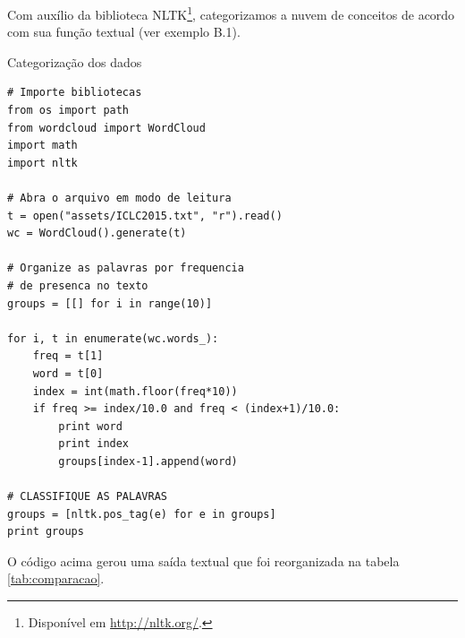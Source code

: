 Com auxílio da biblioteca NLTK\footnote{Disponível em \url{http://nltk.org/}.}, categorizamos a nuvem de conceitos de acordo com sua função textual (ver exemplo B.1). 

\begin{example}{Categorização dos dados}
\begin{verbatim}
# Importe bibliotecas
from os import path
from wordcloud import WordCloud
import math
import nltk

# Abra o arquivo em modo de leitura
t = open("assets/ICLC2015.txt", "r").read()
wc = WordCloud().generate(t)

# Organize as palavras por frequencia
# de presenca no texto
groups = [[] for i in range(10)]

for i, t in enumerate(wc.words_):
    freq = t[1]
    word = t[0]
    index = int(math.floor(freq*10))
    if freq >= index/10.0 and freq < (index+1)/10.0:
        print word
        print index
        groups[index-1].append(word)

# CLASSIFIQUE AS PALAVRAS
groups = [nltk.pos_tag(e) for e in groups]
print groups
\end{verbatim}
\label{cod:classes}
\end{example}

O código acima gerou uma saída textual que foi reorganizada na tabela \autoref{tab:comparacao}.

